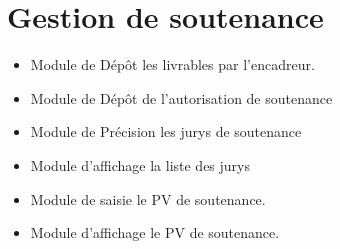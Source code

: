 \documentclass[11pt,fleqn]{book} %
\begin{document}
\section{Gestion de soutenance}
\begin{itemize}
     \item Module de Dépôt les livrables par l'encadreur.
    \item Module de Dépôt de l’autorisation de soutenance
    \item Module de Précision les jurys de soutenance
    \item Module d'affichage la liste des jurys
    \item Module de saisie le PV de soutenance.
    \item Module d'affichage le PV de soutenance.\\
\end{itemize}
\end{document}
